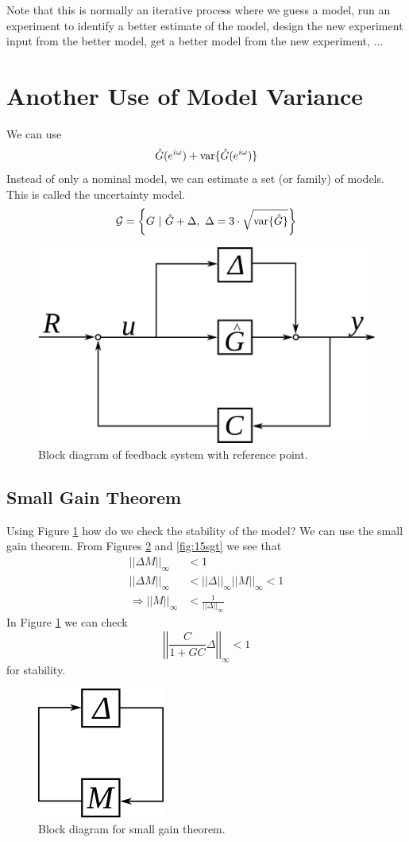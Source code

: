 Note that this is normally an iterative process where we guess a model, run an experiment to identify a better estimate of the model, design the new experiment input from the better model, get a better model from the new experiment, ...

\section{Another Use of Model Variance}
We can use
$$\hat{G}(e^{i\omega}) + \text{var}\{\hat{G}(e^{i\omega})\}$$
Instead of only a nominal model, we can estimate a set (or family) of models. This is called the uncertainty model.
$$\mathcal{G} = \left\lbrace G ~|~ \hat{G}+\Delta, ~\Delta=3\cdot\sqrt{\text{var}\{\hat{G}\}}\right\rbrace$$

\begin{figure}[ht!]
	\centering
	\includegraphics[width=.3\textwidth]{images/15bd}
	\caption{Block diagram of feedback system with reference point.}
	\label{fig:15bd}
\end{figure}

\subsection{Small Gain Theorem}
Using Figure \ref{fig:15bd} how do we check the stability of the model? We can use the small gain theorem. From Figures \ref{fig:15sgtbd} and \ref{fig:15sgt} we see that
\begin{align*}
||\Delta M||_\infty &< 1 \\
||\Delta M||_\infty &< ||\Delta||_\infty||M||_\infty < 1 \\
\Rightarrow ||M||_\infty &< \frac{1}{||\Delta||_\infty}
\end{align*}
In Figure \ref{fig:15bd} we can check
$$\left|\left|\frac{C}{1+GC}\Delta\right|\right|_\infty < 1$$
for stability.

\begin{figure}[ht!]
	\centering
	\includegraphics[width=.1\textwidth]{images/15sgtbd}
	\caption{Block diagram for small gain theorem.}
	\label{fig:15sgtbd}
\end{figure}

